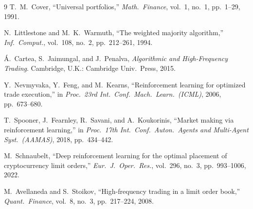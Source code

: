 \documentclass[journal,onecolumn,11pt]{IEEEtran}
\begin{document}
\begin{thebibliography}{9}
T.~M.~Cover,
``Universal portfolios,''
\emph{Math.\ Finance}, vol.~1, no.~1, pp.~1--29, 1991.

N.~Littlestone and M.~K.~Warmuth,
``The weighted majority algorithm,''
\emph{Inf.\ Comput.}, vol.~108, no.~2, pp.~212--261, 1994.

\'A.~Cartea, S.~Jaimungal, and J.~Penalva,
\emph{Algorithmic and High-Frequency Trading}.
Cambridge, U.K.: Cambridge Univ.\ Press, 2015.

Y.~Nevmyvaka, Y.~Feng, and M.~Kearns,
``Reinforcement learning for optimized trade execution,''
in \emph{Proc.\ 23rd Int.\ Conf.\ Mach.\ Learn.\ (ICML)}, 2006, pp.~673--680.

T.~Spooner, J.~Fearnley, R.~Savani, and A.~Koukorinis,
``Market making via reinforcement learning,''
in \emph{Proc.\ 17th Int.\ Conf.\ Auton.\ Agents and Multi-Agent Syst.\ (AAMAS)}, 2018, pp.~434--442.

M.~Schnaubelt,
``Deep reinforcement learning for the optimal placement of cryptocurrency limit orders,''
\emph{Eur.\ J.\ Oper.\ Res.}, vol.~296, no.~3, pp.~993--1006, 2022.

M.~Avellaneda and S.~Stoikov,
``High-frequency trading in a limit order book,''
\emph{Quant.\ Finance}, vol.~8, no.~3, pp.~217--224, 2008.

\end{thebibliography}
\end{document}
